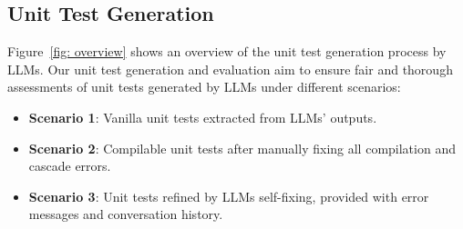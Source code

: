 

\subsection{Unit Test Generation }
\label{unit_test_generation}
Figure~\ref{fig: overview} shows an overview of the unit test generation process by LLMs.
Our unit test generation and evaluation aim to ensure fair and thorough assessments of unit tests generated by LLMs under different scenarios:
\begin{itemize}
[noitemsep,topsep=0pt,itemsep=1.8pt, leftmargin=10pt]
    \item \textbf{Scenario 1}: Vanilla unit tests extracted from LLMs' outputs.
    \item \textbf{Scenario 2}: Compilable unit tests after manually fixing all compilation and cascade errors. 
    \item \textbf{Scenario 3}: Unit tests refined by LLMs self-fixing, provided with error messages and conversation history.
\end{itemize}


